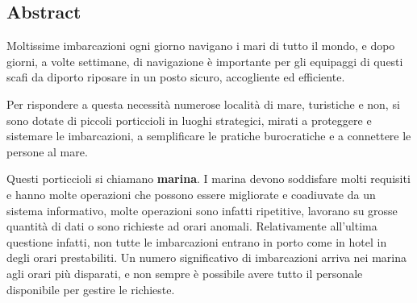\subsection{Abstract}

Moltissime imbarcazioni ogni giorno navigano i mari di tutto il mondo, e dopo giorni, a volte settimane, di navigazione è importante per gli equipaggi di questi scafi da diporto riposare in un posto sicuro, accogliente ed efficiente.

Per rispondere a questa necessità numerose località di mare, turistiche e non, si sono dotate di piccoli porticcioli in luoghi strategici, mirati a proteggere e sistemare le imbarcazioni, a semplificare le pratiche burocratiche e a connettere le persone al mare.

Questi porticcioli si chiamano \textbf{marina}. I marina devono soddisfare molti requisiti e hanno molte operazioni che possono essere migliorate e coadiuvate da un sistema informativo, molte operazioni sono infatti ripetitive, lavorano su grosse quantità di dati o sono richieste ad orari anomali. Relativamente all'ultima questione infatti, non tutte le imbarcazioni entrano in porto come in hotel in degli orari prestabiliti. Un numero significativo di imbarcazioni arriva nei marina agli orari più disparati, e non sempre è possibile avere tutto il personale disponibile per gestire le richieste.
